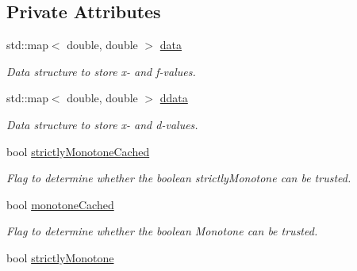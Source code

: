 \subsection*{Private Attributes}
\begin{DoxyCompactItemize}
\item 
\hypertarget{class_opm_1_1_monot_cubic_interpolator_afd0b97a51e1aeef7f8688a2c20c64273}{}std\+::map$<$ double, double $>$ \hyperlink{class_opm_1_1_monot_cubic_interpolator_afd0b97a51e1aeef7f8688a2c20c64273}{data}\label{class_opm_1_1_monot_cubic_interpolator_afd0b97a51e1aeef7f8688a2c20c64273}

\begin{DoxyCompactList}\small\item\em Data structure to store x-\/ and f-\/values. \end{DoxyCompactList}\item 
\hypertarget{class_opm_1_1_monot_cubic_interpolator_a28418ab9be03135feafcf983bdb8d0aa}{}std\+::map$<$ double, double $>$ \hyperlink{class_opm_1_1_monot_cubic_interpolator_a28418ab9be03135feafcf983bdb8d0aa}{ddata}\label{class_opm_1_1_monot_cubic_interpolator_a28418ab9be03135feafcf983bdb8d0aa}

\begin{DoxyCompactList}\small\item\em Data structure to store x-\/ and d-\/values. \end{DoxyCompactList}\item 
\hypertarget{class_opm_1_1_monot_cubic_interpolator_a502a4814e58bbaffa7593e81cca6a3a0}{}bool \hyperlink{class_opm_1_1_monot_cubic_interpolator_a502a4814e58bbaffa7593e81cca6a3a0}{strictly\+Monotone\+Cached}\label{class_opm_1_1_monot_cubic_interpolator_a502a4814e58bbaffa7593e81cca6a3a0}

\begin{DoxyCompactList}\small\item\em Flag to determine whether the boolean strictly\+Monotone can be trusted. \end{DoxyCompactList}\item 
\hypertarget{class_opm_1_1_monot_cubic_interpolator_aa5e0006858d26e9f9d57956dea7852d9}{}bool \hyperlink{class_opm_1_1_monot_cubic_interpolator_aa5e0006858d26e9f9d57956dea7852d9}{monotone\+Cached}\label{class_opm_1_1_monot_cubic_interpolator_aa5e0006858d26e9f9d57956dea7852d9}

\begin{DoxyCompactList}\small\item\em Flag to determine whether the boolean Monotone can be trusted. \end{DoxyCompactList}\item 
\hypertarget{class_opm_1_1_monot_cubic_interpolator_a88975c8e338ba67dedc671c9efdb2e6d}{}bool \hyperlink{class_opm_1_1_monot_cubic_interpolator_a88975c8e338ba67dedc671c9efdb2e6d}{strictly\+Monotone}\label{class_opm_1_1_monot_cubic_interpolator_a88975c8e338ba67dedc671c9efdb2e6d}


\end{DoxyCompactItemize}
